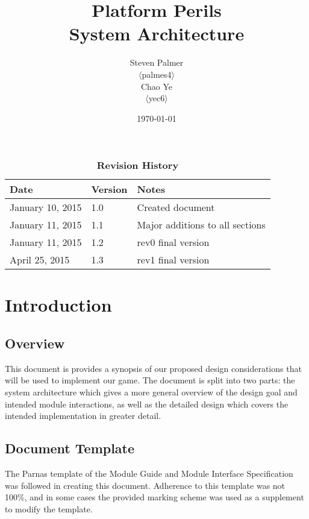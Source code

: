 \documentclass[12pt, titlepage]{article}
\begin{document}
\title{\bf Platform Perils\\[\baselineskip]\Large System Architecture}
\author{Steven Palmer\\$\langle$palmes4$\rangle$\\Chao Ye\\$\langle$yec6$\rangle$}
\date{\today}
	
\maketitle

\tableofcontents
\listoftables
\listoffigures


\begin{table}[hTB]
\caption*{\bf Revision History}
\begin{tabularx}{\textwidth}{p{3.5cm}p{2cm}X}
\toprule {\bf Date} & {\bf Version} & {\bf Notes}\\
\midrule
January 10, 2015 & 1.0 & Created document\\
January 11, 2015 & 1.1 & Major additions to all sections\\
January 11, 2015 & 1.2 & rev0 final version\\
April 25, 2015 & 1.3 & rev1 final version\\
\bottomrule
\end{tabularx}
\end{table}

\newpage


\section{Introduction}
\subsection{Overview}
This document is provides a synopsis of our proposed design considerations that will be used to implement our game.  The document is split into two parts:  the system architecture which gives a more general overview of the design goal and intended module interactions, as well as the detailed design which covers the intended implementation in greater detail.



\subsection{Document Template}
The Parnas template of the Module Guide and Module Interface Specification was followed in creating this document.  Adherence to this template was not 100\%, and in some cases the provided marking scheme was used as a supplement to modify the template.
\end{document}
